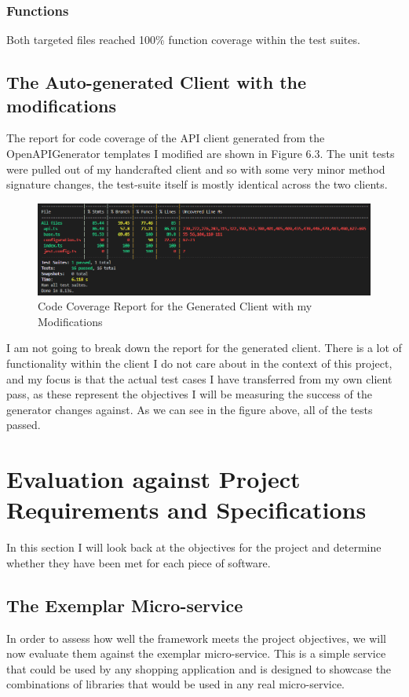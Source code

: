 \subsubsection{Functions}
Both targeted files reached 100\% function coverage within the test suites.
\subsection{The Auto-generated Client with the modifications}
The report for code coverage of the API client generated from the OpenAPIGenerator templates I modified are shown in Figure 6.3. The unit tests were pulled out of my handcrafted client and so with some very minor method signature changes, the test-suite itself is mostly identical across the two clients.
\begin{figure}[!htb]
\caption{Code Coverage Report for the Generated Client with my Modifications}
\centering
\includegraphics[scale=0.55]{FYP_Dissertation_template/Figures/modified-client-code-coverage.PNG}
\end{figure}
\FloatBarrier
I am not going to break down the report for the generated client. There is a lot of functionality within the client I do not care about in the context of this project, and my focus is that the actual test cases I have transferred from my own client pass, as these represent the objectives I will be measuring the success of the generator changes against. As we can see in the figure above, all of the tests passed.
\section{Evaluation against Project Requirements and Specifications}
In this section I will look back at the objectives for the project and determine whether they have been met for each piece of software.
\subsection{The Exemplar Micro-service}
In order to assess how well the framework meets the project objectives, we will now evaluate them against the exemplar micro-service. This is a simple service that could be used by any shopping application and is designed to showcase the combinations of libraries that would be used in any real micro-service.
